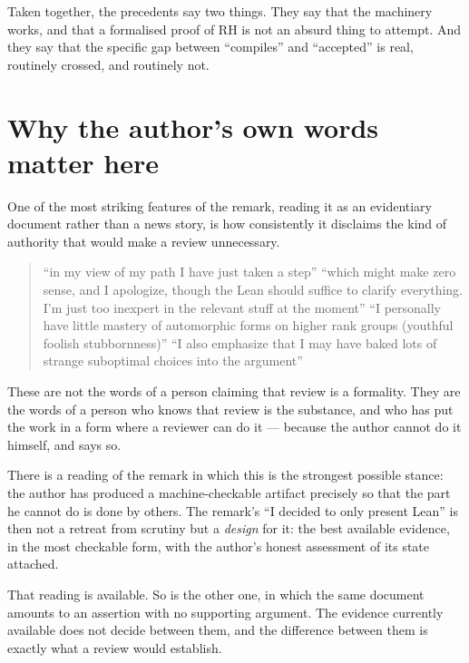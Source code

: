 Taken together, the precedents say two things. They say that the machinery
works, and that a formalised proof of RH is not an absurd thing to attempt.
And they say that the specific gap between ``compiles'' and ``accepted'' is
real, routinely crossed, and routinely not.

\section{Why the author's own words matter here}One of the most striking features of the remark, reading it as an
evidentiary document rather than a news story, is how consistently it
disclaims the kind of authority that would make a review unnecessary.

\begin{quote}
\small
``in my view of my path I have just taken a step'' \qquad
``which might make zero sense, and I apologize, though the Lean should suffice
to clarify everything. I'm just too inexpert in the relevant stuff at the
moment'' \qquad
``I personally have little mastery of automorphic forms on higher rank groups
(youthful foolish stubbornness)'' \qquad
``I also emphasize that I may have baked lots of strange suboptimal choices
into the argument''
\end{quote}

These are not the words of a person claiming that review is a formality. They
are the words of a person who knows that review is the substance, and who has
put the work in a form where a reviewer can do it --- because the author cannot
do it himself, and says so.

There is a reading of the remark in which this is the strongest possible
stance: the author has produced a machine-checkable artifact precisely so that
the part he cannot do is done by others. The remark's ``I decided to only
present Lean'' is then not a retreat from scrutiny but a \emph{design} for it:
the best available evidence, in the most checkable form, with the author's
honest assessment of its state attached.

That reading is available. So is the other one, in which the same document
amounts to an assertion with no supporting argument. The evidence currently
available does not decide between them, and the difference between them is
exactly what a review would establish.

